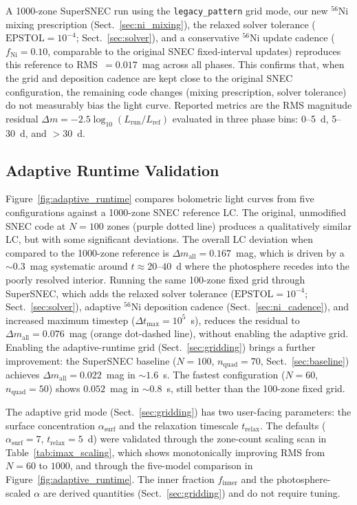 \documentclass[twocolumn,linenumbers]{aastex701}
\begin{document}
A 1000-zone SuperSNEC run using the \texttt{legacy\_\-pattern} grid mode, our new $^{56}$Ni mixing prescription (Sect.~\ref{sec:ni_mixing}), the relaxed solver tolerance ($\mathrm{EPSTOL} = 10^{-4}$; Sect.~\ref{sec:solver}), and a conservative $^{56}$Ni update cadence ($f_{\mathrm{Ni}} = 0.10$, comparable to the original SNEC fixed-interval updates) reproduces this reference to RMS~$= 0.017$~mag across all phases. This confirms that, when the grid and deposition cadence are kept close to the original SNEC configuration, the remaining code changes (mixing prescription, solver tolerance) do not measurably bias the light curve. Reported metrics are the RMS magnitude residual $\Delta m = -2.5\log_{10}(L_{\mathrm{run}}/L_{\mathrm{ref}})$ evaluated in three phase bins: 0--5~d, 5--30~d, and $>30$~d. %

\subsection{Adaptive Runtime Validation}
\label{sec:adaptive_validation}

Figure~\ref{fig:adaptive_runtime} compares bolometric light curves from five configurations against a 1000-zone SNEC reference LC. The original, unmodified SNEC code at $N=100$ zones (purple dotted line) produces a qualitatively similar LC, but with some significant deviations. The overall LC deviation when compared to the 1000-zone reference is $\Delta m_\mathrm{all}=0.167$~mag, which is driven by a ${\sim}0.3$~mag systematic around $t\approx 20\text{--}40$~d where the photosphere recedes into the poorly resolved interior. Running the same 100-zone fixed grid through SuperSNEC, which adds the relaxed solver tolerance ($\mathrm{EPSTOL}=10^{-4}$; Sect.~\ref{sec:solver}), adaptive $^{56}$Ni deposition cadence (Sect.~\ref{sec:ni_cadence}), and increased maximum timestep ($\Delta t_{\mathrm{max}}=10^5$~s), reduces the residual to $\Delta m_\mathrm{all}=0.076$~mag (orange dot-dashed line), without enabling the adaptive grid. Enabling the adaptive-runtime grid (Sect.~\ref{sec:gridding}) brings a further improvement: the SuperSNEC baseline ($N=100$, $n_\mathrm{quad}=70$, Sect.~\ref{sec:baseline}) achieves $\Delta m_\mathrm{all}=0.022$~mag in ${\sim}1.6$~s. The fastest configuration ($N=60$, $n_\mathrm{quad}=50$) shows $0.052$~mag in ${\sim}0.8$~s, still better than the 100-zone fixed grid.

The adaptive grid mode (Sect.~\ref{sec:gridding}) has two user-facing parameters: the surface concentration $\alpha_{\mathrm{surf}}$ and the relaxation timescale $t_{\mathrm{relax}}$. The defaults ($\alpha_{\mathrm{surf}} = 7$, $t_{\mathrm{relax}} = 5$~d) were validated through the zone-count scaling scan in Table~\ref{tab:imax_scaling}, which shows monotonically improving RMS from $N = 60$ to $1000$, and through the five-model comparison in Figure~\ref{fig:adaptive_runtime}. The inner fraction $f_{\mathrm{inner}}$ and the photosphere-scaled $\alpha$ are derived quantities (Sect.~\ref{sec:gridding}) and do not require tuning.
\end{document}
